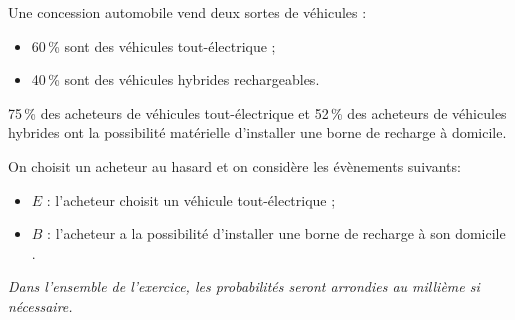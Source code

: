 \medskip

Une concession automobile vend deux sortes de véhicules :


\begin{itemize}[label=$\bullet~$]
\item 60\,\% sont des véhicules tout-électrique ;
\item 40\,\% sont des véhicules hybrides rechargeables.
\end{itemize}

\medskip

75\,\% des acheteurs de véhicules tout-électrique et 52\,\% des acheteurs de véhicules hybrides ont la possibilité matérielle d'installer une borne de recharge à domicile.

On choisit un acheteur au hasard et on considère les évènements suivants:

\begin{itemize}[label=$\bullet~$]
\item $E$ : \og l'acheteur choisit un véhicule tout-électrique \fg{} ;
\item $B$ : \og l'acheteur a la possibilité d'installer une borne de recharge à son domicile \fg.
\end{itemize}

\medskip

\emph{Dans l'ensemble de l'exercice, les probabilités seront arrondies au millième si nécessaire.}

\medskip

